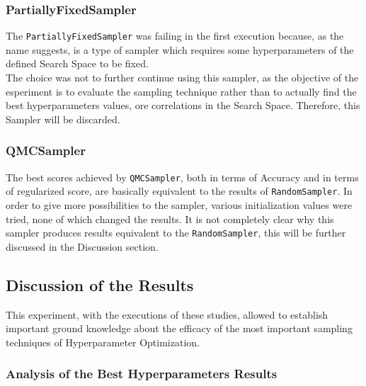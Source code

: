 \subsubsection{PartiallyFixedSampler}

The \texttt{PartiallyFixedSampler} was failing in the first execution because, as the name suggests, is a type of sampler which requires some hyperparameters of the defined Search Space to be fixed.
\\[0.3cm]The choice was not to further continue using this sampler, as the objective of the esperiment is to evaluate the sampling technique rather than to actually find the best hyperparameters values, ore correlations in the Search Space.
Therefore, this Sampler will be discarded.

\subsubsection{QMCSampler}

The best scores achieved by \texttt{QMCSampler}, both in terms of Accuracy and in terms of regularized score, are basically equivalent to the results of \texttt{RandomSampler}.
In order to give more possibilities to the sampler, various initialization values were tried, none of which changed the results.
It is not completely clear why this sampler produces results equivalent to the \texttt{RandomSampler}, this will be further discussed in the Discussion section.

\subsection{Discussion of the Results}

This experiment, with the executions of these studies, allowed to establish important ground knowledge about the efficacy of the most important sampling techniques of Hyperparameter Optimization.

\subsubsection{Analysis of the Best Hyperparameters Results}

